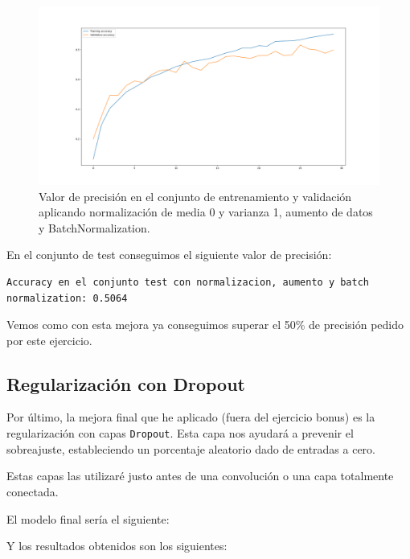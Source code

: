 \documentclass[12pt, spanish]{article}
\begin{document}
\begin{figure}[H]
  \centering
      \includegraphics[width=\textwidth]{1-2-batch-2.png}
 		\caption{Valor de precisión en el conjunto de entrenamiento y validación aplicando normalización de media 0 y varianza 1, aumento de datos y BatchNormalization.}
\end{figure}



En el conjunto de test conseguimos el siguiente valor de precisión:

\begin{lstlisting}
Accuracy en el conjunto test con normalizacion, aumento y batch normalization: 0.5064
\end{lstlisting}

Vemos como con esta mejora ya conseguimos superar el 50\% de precisión pedido por este ejercicio.





\subsection{Regularización con Dropout}

Por último, la mejora final que he aplicado (fuera del ejercicio bonus) es la regularización con capas \texttt{Dropout}\cite{dropout}. Esta capa nos ayudará a prevenir el sobreajuste, estableciendo un porcentaje aleatorio dado de entradas a cero.

Estas capas las utilizaré justo antes de una convolución o una capa totalmente conectada.

El modelo final sería el siguiente:



Y los resultados obtenidos son los siguientes:
\end{document}
